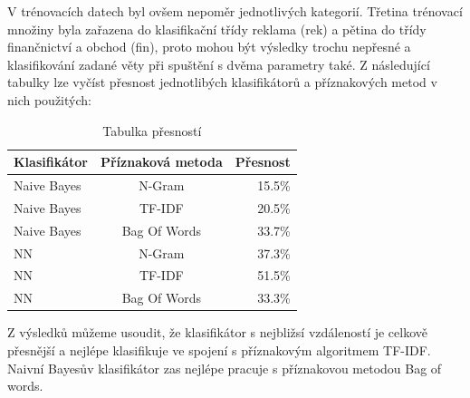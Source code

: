 \documentclass[
12pt,
a4paper,
pdftex,
czech,
titlepage
]{report}
\begin{document}
V trénovacích datech byl ovšem nepoměr jednotlivých kategorií. Třetina trénovací množiny byla zařazena do klasifikační třídy reklama (rek) a pětina do třídy finančnictví a obchod (fin), proto mohou být výsledky trochu nepřesné a klasifikování zadané věty při spuštění s dvěma parametry také. Z následující tabulky lze vyčíst přesnost jednotlibých klasifikátorů a příznakových metod v nich použitých:
\begin{table}[h!]  
\begin{center}  
\caption{Tabulka přesností}  
\label{tab:Table1}  
\begin{tabular}{|l|c|r|}  
\textbf{Klasifikátor} & \textbf{Příznaková metoda} & \textbf{Přesnost}\\
\hline  
Naive Bayes & N-Gram & 15.5\% \\  
Naive Bayes & TF-IDF & 20.5\% \\  
Naive Bayes & Bag Of Words & 33.7\% \\  
NN & N-Gram & 37.3\% \\  
NN & TF-IDF & 51.5\% \\  
NN & Bag Of Words & 33.3\% \\  
\end{tabular}  
\end{center}  
\end{table}  
Z výsledků můžeme usoudit, že klasifikátor s nejbližsí vzdáleností je celkově přesnější a nejlépe klasifikuje ve spojení s příznakovým algoritmem TF-IDF. Naivní Bayesův klasifikátor zas nejlépe pracuje s příznakovou metodou Bag of words.
\end{document}
